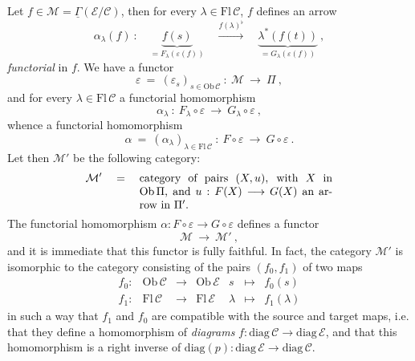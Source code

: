 \documentclass[11pt]{article}
\newcommand{\printedpage}[1]{\marginpar{\footnotesize p.~#1}}
\newcommand{\msp}[1]{\marginpar{\footnotesize [#1]}}
\newcommand{\uGamma}{\underline{\Gamma}}
\newcommand{\Ob}{\mathrm{Ob}\,}
\newcommand{\Fl}{\mathrm{Fl}\,}
\newcommand{\diag}{\mathrm{diag}\,}
\begin{document}
Let $f \in \mathcal{M} = \uGamma(\mathcal{E}/\mathcal{C})$, then for every $\lambda \in \Fl\mathcal{C}$, $f$ defines an arrow
\[
\alpha_\lambda(f) \ : \quad \underbrace{f(s)}_{= F_\lambda(\varepsilon(f))} \quad \xrightarrow{f(\lambda)^\flat} \quad \underbrace{\lambda^*(f(t))}_{= G_\lambda(\varepsilon(f))} \ ,
\]
\textit{functorial} in $f$. We have a functor
\[
\varepsilon \ = \ (\varepsilon_s)_{s\in\Ob\mathcal{C}} \ : \ \mathcal{M} \ \longrightarrow \ \Pi \ ,
\]
and for every $\lambda \in \Fl\mathcal{C}$ a functorial homomorphism
\[
\alpha_\lambda \ : \ F_\lambda \circ \varepsilon \ \longrightarrow \ G_\lambda \circ \varepsilon \ ,
\]
whence a functorial homomorphism
\[
\alpha \ = \ (\alpha_\lambda)_{\lambda\in\Fl\mathcal{C}} \ : \ F \circ \varepsilon \ \longrightarrow \ G \circ \varepsilon \ .
\]
Let then $\mathcal{M}'$ be the following category:
\printedpage{153}
\msp{page 403}
\[
\mathcal{M}' \quad = \quad \parbox[t]{0.5\textwidth}{category of pairs $(X,u)$, with $X$ in $\Ob\Pi$, and $u : F(X) \longrightarrow G(X)$ an arrow in $\Pi'$.}
\]
The functorial homomorphism $\alpha : F \circ \varepsilon \longrightarrow G \circ \varepsilon$ defines a functor
\[
\mathcal{M} \ \longrightarrow \ \mathcal{M}' \ ,
\]
and it is immediate that this functor is fully faithful. In fact, the category $\mathcal{M}'$ is isomorphic to the category consisting of the pairs $(f_0,f_1)$ of two maps
\[
\begin{array}{lcccccc}
f_0 : & \Ob\mathcal{C} & \longrightarrow & \Ob\mathcal{E} & s & \longmapsto & f_0(s)\\[1ex]
f_1 : & \Fl\mathcal{C} & \longrightarrow & \Fl\mathcal{E} & \lambda & \longmapsto & f_1(\lambda)
\end{array}
\]
in such a way that $f_1$ and $f_0$ are compatible with the source and target maps, i.e. that they define a homomorphism of \textit{diagrams} $f : \diag\mathcal{C} \longrightarrow \diag\mathcal{E}$, and that this homomorphism is a right inverse of $\mathrm{diag}(p) : \diag\mathcal{E} \longrightarrow \diag\mathcal{C}$.
\end{document}
